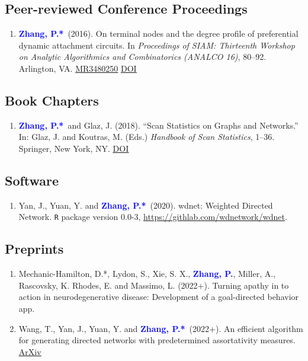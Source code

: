 \documentclass{res}
\def\MR#1{\href{http://www.ams.org/mathscinet-getitem?mr=#1}{MR#1}}
\newcommand{\PZ}{\textbf{\textcolor{blue}{Zhang, P.*}}}
\newcommand{\PZnot}{\textbf{\textcolor{blue}{Zhang, P.}}}
\begin{document}
\begin{resume}
\subsection{Peer-reviewed Conference Proceedings}
\begin{enumerate}
	\item \PZ\ (2016). On terminal nodes and the degree 
	profile of preferential dynamic attachment circuits. In 
	\emph{Proceedings of SIAM: Thirteenth Workshop on Analytic 
	Algorithmics and Combinatorics (ANALCO 16)}, 80--92. Arlington, 
	VA. \MR{3480250}
	\href{https://doi.org/10.1137/1.9781611974324.9}
	{\underline{DOI}}	
\end{enumerate}

\subsection{Book Chapters}
\begin{enumerate}
	\item \PZ\ and {\sc Glaz, J.} (2018). ``Scan 
	Statistics on Graphs and Networks.'' In: Glaz, J. and Koutras, 
	M. (Eds.) {\em Handbook of Scan Statistics}, 1--36. Springer, 
	New York, NY. 
	\href{https://doi.org/10.1007/978-1-4614-8414-1_43-1}
	{\underline{DOI}}	
\end{enumerate}

\subsection{Software}
\begin{enumerate}
	\item {\sc Yan, J., Yuan, Y.} and \PZ\ (2020). 
	wdnet: Weighted Directed Network. {\tt R} package version 0.0-3, 
	\url{https://githlab.com/wdnetwork/wdnet}.
\end{enumerate}

\subsection{Preprints}
\begin{enumerate}
	\item {\sc Mechanic-Hamilton, D.*, Lydon, S., Xie, S. X.,} 
	\PZnot, {\sc Miller, A., Rascovsky, K. Rhodes, E.} and {\sc 
	Massimo, L.} (2022+). Turning apathy in to action in 
	neurodegenerative disease: Development of a goal-directed 
	behavior app.
	
	\item {\sc Wang, T., Yan, J., Yuan, Y.} and \PZ\ (2022+). An 
	efficient algorithm for generating directed networks with 
	predetermined assortativity measures. 
	\href{https://arxiv.org/pdf/2201.03451.pdf}{\underline{ArXiv}}
	

\end{enumerate}
\end{resume}
\end{document}
